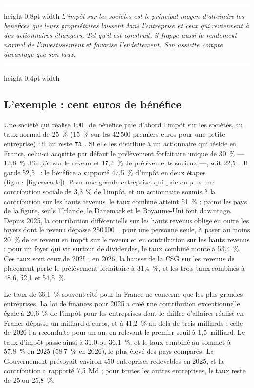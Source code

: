 \documentclass[11pt,a4paper]{article}
\providecommand{\euro}{\texteuro}
\newenvironment{argument}
  {\par\smallskip\noindent\begin{minipage}{\linewidth}%
   \color{encre}\hrule height 0.8pt width \linewidth \vspace{7pt}%
   \large\itshape}
  {\par\vspace{7pt}\hrule height 0.4pt width \linewidth\end{minipage}\par\medskip}
\begin{document}
\begin{argument}
L'impôt sur les sociétés est le principal moyen d'atteindre les bénéfices que leurs propriétaires
laissent dans l'entreprise et ceux qui reviennent à des actionnaires étrangers. Tel qu'il est
construit, il frappe aussi le rendement normal de l'investissement et favorise l'endettement. Son
assiette compte davantage que son taux.
\end{argument}

\subsection{L'exemple : cent euros de bénéfice}

Une société qui réalise 100~\euro{} de bénéfice paie d'abord l'impôt sur les sociétés, au taux
normal de 25~\% (15~\% sur les 42\,500 premiers euros pour une petite entreprise) : il lui reste
75~\euro{}. Si elle les distribue à un actionnaire qui réside en France, celui-ci acquitte par
défaut le prélèvement forfaitaire unique de 30~\% --- 12,8~\% d'impôt sur le revenu et 17,2~\% de
prélèvements sociaux ---, soit 22,5~\euro{}. Il garde 52,5~\euro{} : le bénéfice a supporté
47,5~\% d'impôt en deux étapes (figure~\ref{fig:cascade}). Pour une grande entreprise, qui paie en
plus une contribution sociale de 3,3~\% de l'impôt, et un actionnaire soumis à la contribution sur
les hauts revenus, le taux combiné atteint 51~\% ; parmi les pays de la figure, seuls l'Irlande, le
Danemark et le Royaume-Uni font davantage. Depuis 2025, la contribution différentielle sur les hauts
revenus oblige en outre les foyers dont le revenu dépasse 250\,000~\euro{}, pour une personne seule,
à payer au moins 20~\% de ce revenu en impôt sur le revenu et en contribution sur les hauts
revenus : pour un foyer qui vit surtout de dividendes, le taux combiné monte à 53,4~\%. Ces taux
sont ceux de 2025 ; en 2026, la hausse de la CSG sur les revenus de placement porte le prélèvement
forfaitaire à 31,4~\%, et les trois taux combinés à 48,6, 52,1 et 54,5~\%.

Le taux de 36,1~\% souvent cité pour la France ne concerne que les plus grandes entreprises. La loi
de finances pour 2025 a créé une contribution exceptionnelle égale à 20,6~\% de l'impôt pour les
entreprises dont le chiffre d'affaires réalisé en France dépasse un milliard d'euros, et à 41,2~\%
au-delà de trois milliards ; celle de 2026 l'a reconduite pour un an, en relevant le premier seuil
à 1,5~milliard. Le taux d'impôt passe ainsi à 31,0 ou 36,1~\%, et le taux combiné au sommet à
57,8~\% en 2025 (58,7~\% en 2026), le plus élevé des pays comparés. Le Gouvernement prévoyait
environ 450 entreprises redevables en 2025, et la contribution a rapporté 7,5~Md\euro{} ; pour
toutes les autres entreprises, le taux reste de 25 ou 25,8~\%.
\end{document}
